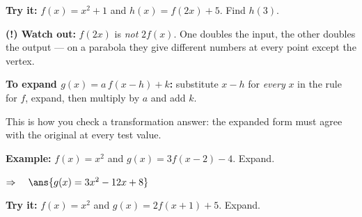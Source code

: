\documentclass[12pt]{article}
\begin{document}
\begin{tryitbox}
\textbf{Try it:} \quad $f(x) = x^{2} + 1$ and $h(x) = f(2x) + 5$. Find $h(3)$.\\[2pt]
\end{tryitbox}

\begin{watchoutbox}
\textbf{(!) Watch out:} $f(2x)$ is \emph{not} $2f(x)$. One doubles the input, the other doubles the output --- on a parabola they give different numbers at every point except the vertex.
\end{watchoutbox}


\begin{formulabox}
\textbf{To expand $g(x) = a\,f(x - h) + k$:} substitute $x - h$ for \emph{every} $x$ in the rule for $f$, expand, then multiply by $a$ and add $k$.\par
This is how you check a transformation answer: the expanded form must agree with the original at every test value.
\end{formulabox}

\begin{examplebox}
\textbf{Example:} \quad $f(x) = x^{2}$ and $g(x) = 3f(x - 2) - 4$. Expand.

$\Rightarrow\quad \ans{g(x) = 3x^{2} - 12x + 8}$
\end{examplebox}

\begin{tryitbox}
\textbf{Try it:} \quad $f(x) = x^{2}$ and $g(x) = 2f(x + 1) + 5$. Expand.\\[2pt]
\end{tryitbox}
\end{document}
